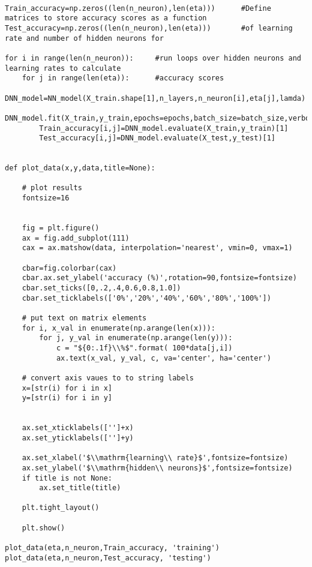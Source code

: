 \begin{verbatim}
    
Train_accuracy=np.zeros((len(n_neuron),len(eta)))      #Define matrices to store accuracy scores as a function
Test_accuracy=np.zeros((len(n_neuron),len(eta)))       #of learning rate and number of hidden neurons for 

for i in range(len(n_neuron)):     #run loops over hidden neurons and learning rates to calculate 
    for j in range(len(eta)):      #accuracy scores 
        DNN_model=NN_model(X_train.shape[1],n_layers,n_neuron[i],eta[j],lamda)
        DNN_model.fit(X_train,y_train,epochs=epochs,batch_size=batch_size,verbose=1)
        Train_accuracy[i,j]=DNN_model.evaluate(X_train,y_train)[1]
        Test_accuracy[i,j]=DNN_model.evaluate(X_test,y_test)[1]
               

def plot_data(x,y,data,title=None):

    # plot results
    fontsize=16


    fig = plt.figure()
    ax = fig.add_subplot(111)
    cax = ax.matshow(data, interpolation='nearest', vmin=0, vmax=1)
    
    cbar=fig.colorbar(cax)
    cbar.ax.set_ylabel('accuracy (%)',rotation=90,fontsize=fontsize)
    cbar.set_ticks([0,.2,.4,0.6,0.8,1.0])
    cbar.set_ticklabels(['0%','20%','40%','60%','80%','100%'])

    # put text on matrix elements
    for i, x_val in enumerate(np.arange(len(x))):
        for j, y_val in enumerate(np.arange(len(y))):
            c = "${0:.1f}\\%$".format( 100*data[j,i])  
            ax.text(x_val, y_val, c, va='center', ha='center')

    # convert axis vaues to to string labels
    x=[str(i) for i in x]
    y=[str(i) for i in y]


    ax.set_xticklabels(['']+x)
    ax.set_yticklabels(['']+y)

    ax.set_xlabel('$\\mathrm{learning\\ rate}$',fontsize=fontsize)
    ax.set_ylabel('$\\mathrm{hidden\\ neurons}$',fontsize=fontsize)
    if title is not None:
        ax.set_title(title)

    plt.tight_layout()

    plt.show()
    
plot_data(eta,n_neuron,Train_accuracy, 'training')
plot_data(eta,n_neuron,Test_accuracy, 'testing')


\end{verbatim}


